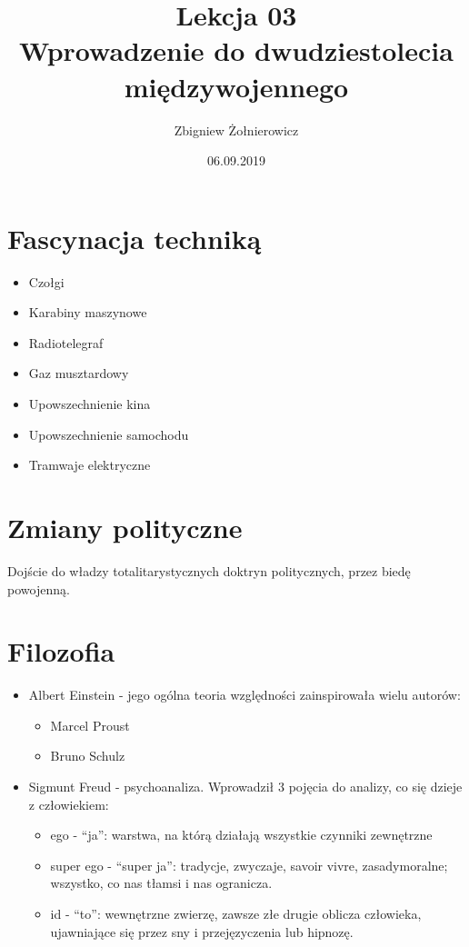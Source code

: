 \documentclass[a4paper]{article}
\begin{document}
\title{{\huge Lekcja 03} \\
{\large Wprowadzenie do dwudziestolecia międzywojennego}}
\author{Zbigniew Żołnierowicz}
\date{06.09.2019}
\maketitle
\section*{Fascynacja techniką}
\begin{itemize}
    \item Czołgi
    \item Karabiny maszynowe
    \item Radiotelegraf
    \item Gaz musztardowy
    \item Upowszechnienie kina
    \item Upowszechnienie samochodu
    \item Tramwaje elektryczne
\end{itemize}
\section*{Zmiany polityczne}
Dojście do władzy totalitarystycznych doktryn politycznych, przez biedę powojenną.
\section*{Filozofia}
\begin{itemize}
    \item Albert Einstein - jego ogólna teoria względności zainspirowała wielu autorów: 
    \begin{itemize}
        \item Marcel Proust
        \item Bruno Schulz
    \end{itemize}
    \item Sigmunt Freud - psychoanaliza. Wprowadził 3 pojęcia do analizy, co się dzieje z człowiekiem:
    \begin{itemize}
        \item ego - ``ja'': warstwa, na którą działają wszystkie czynniki zewnętrzne
        \item super ego - ``super ja'': tradycje, zwyczaje, savoir vivre, zasady\newline moralne; wszystko, co nas tłamsi i nas ogranicza.
        \item id - ``to'': wewnętrzne zwierzę, zawsze złe drugie oblicza człowieka, ujawniające się przez sny i przejęzyczenia lub hipnozę.
    \end{itemize}
\end{itemize}
\end{document}
